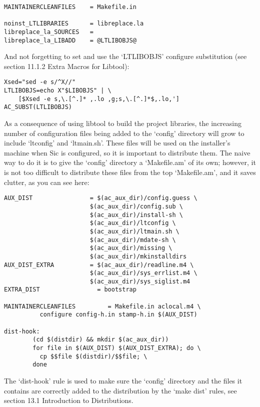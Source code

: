 \begin{Verbatim}[frame=single]
MAINTAINERCLEANFILES    = Makefile.in

noinst_LTLIBRARIES      = libreplace.la
libreplace_la_SOURCES   = 
libreplace_la_LIBADD    = @LTLIBOBJS@
\end{Verbatim}

And not forgetting to set and use the `LTLIBOBJS' configure substitution (see section 11.1.2 Extra Macros for Libtool): 

\begin{Verbatim}[frame=single]
Xsed="sed -e s/^X//"
LTLIBOBJS=echo X"$LIBOBJS" | \
    [$Xsed -e s,\.[^.]* ,.lo ,g;s,\.[^.]*$,.lo,']
AC_SUBST(LTLIBOBJS)
\end{Verbatim}

As a consequence of using libtool to build the project libraries, the increasing number of configuration files being added to the `config' directory will grow to include `ltconfig' and `ltmain.sh'. These files will be used on the installer's machine when Sic is configured, so it is important to distribute them. The naive way to do it is to give the `config' directory a `Makefile.am' of its own; however, it is not too difficult to distribute these files from the top `Makefile.am', and it saves clutter, as you can see here: 

\begin{Verbatim}[frame=single]
AUX_DIST                = $(ac_aux_dir)/config.guess \
                        $(ac_aux_dir)/config.sub \
                        $(ac_aux_dir)/install-sh \
                        $(ac_aux_dir)/ltconfig \
                        $(ac_aux_dir)/ltmain.sh \
                        $(ac_aux_dir)/mdate-sh \
                        $(ac_aux_dir)/missing \
                        $(ac_aux_dir)/mkinstalldirs
AUX_DIST_EXTRA          = $(ac_aux_dir)/readline.m4 \
                        $(ac_aux_dir)/sys_errlist.m4 \
                        $(ac_aux_dir)/sys_siglist.m4
EXTRA_DIST                = bootstrap

MAINTAINERCLEANFILES         = Makefile.in aclocal.m4 \
          configure config-h.in stamp-h.in $(AUX_DIST)

dist-hook:
        (cd $(distdir) && mkdir $(ac_aux_dir))
        for file in $(AUX_DIST) $(AUX_DIST_EXTRA); do \
          cp $$file $(distdir)/$$file; \
        done
\end{Verbatim}

The `dist-hook' rule is used to make sure the `config' directory and the files it contains are correctly added to the distribution by the `make dist' rules, see section 13.1 Introduction to Distributions. 


